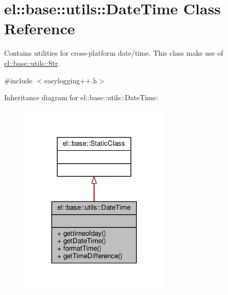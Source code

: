 \hypertarget{classel_1_1base_1_1utils_1_1DateTime}{}\section{el\+:\+:base\+:\+:utils\+:\+:Date\+Time Class Reference}
\label{classel_1_1base_1_1utils_1_1DateTime}


Contains utilities for cross-\/platform date/time. This class make use of \hyperlink{classel_1_1base_1_1utils_1_1Str}{el\+::base\+::utils\+::\+Str}.  




{\ttfamily \#include $<$easylogging++.\+h$>$}



Inheritance diagram for el\+:\+:base\+:\+:utils\+:\+:Date\+Time\+:
\nopagebreak
\begin{figure}[H]
\begin{center}
\leavevmode
\includegraphics[width=204pt]{dc/d11/classel_1_1base_1_1utils_1_1DateTime__inherit__graph}
\end{center}
\end{figure}


